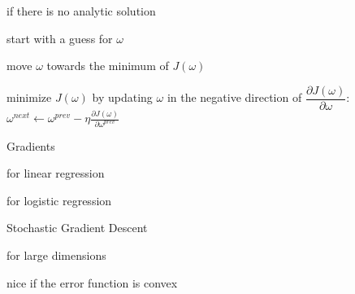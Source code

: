 \documentclass[landscape, a4paper]{article}
\begin{document}
\begin{minipage}[t]{0.2\linewidth}
\begin{betterlist}
\begin{betterlist}
			\begin{betterlist}
				\item  if there is \alert{no analytic solution}
				\item start with a guess for $\omega$
				\item move $\omega$ towards the minimum of $J(\omega)$
				\item minimize $J(\omega)$ by updating $\omega$ in the negative direction of $\dfrac{\partial J(\omega)}{\partial\omega}$: $\displaystyle\omega^{next} \leftarrow \omega^{prev} - \eta \frac{\partial J(\omega)}{\partial\omega^{prev}} $
				\item Gradients
				\begin{betterlist}
					\item for \alert{linear regression}
					\item for \alert{logistic regression}
				\end{betterlist}
				\item Stochastic Gradient Descent
				\begin{betterlist}
					\item for \alert{large dimensions}
					\item nice if the error function is \alert{convex}
				\end{betterlist}
			\end{betterlist}
		\end{betterlist}
	\end{betterlist}
\end{minipage}
\begin{minipage}[t]{0.2\linewidth}
\end{minipage}
\begin{minipage}[t]{0.2\linewidth}
\end{minipage}
\begin{minipage}[t]{0.2\linewidth}
\end{minipage}

\newpage

\begin{minipage}[t]{0.2\linewidth}
\end{minipage}
\begin{minipage}[t]{0.2\linewidth}
\end{minipage}
\begin{minipage}[t]{0.2\linewidth}
\end{minipage}
\begin{minipage}[t]{0.2\linewidth}
\end{minipage}
\begin{minipage}[t]{0.2\linewidth}
\end{minipage}
\end{document}
